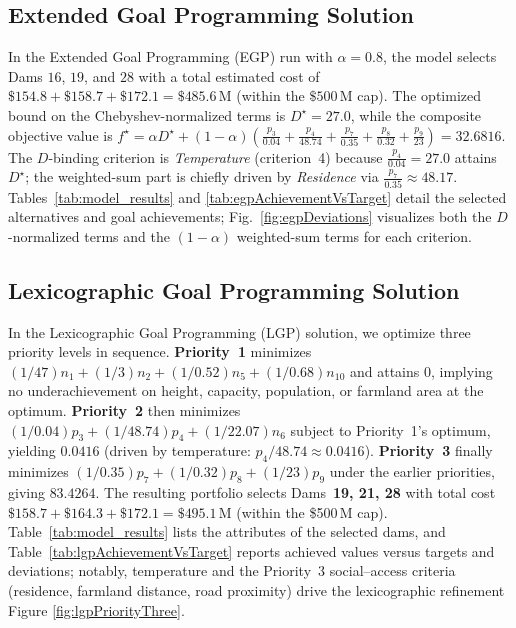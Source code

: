 


\subsection{Extended Goal Programming Solution}
In the Extended Goal Programming (EGP) run with $\alpha=0.8$, the model selects Dams $16$, $19$, and $28$ with a total estimated cost of $\$154.8+\$158.7+\$172.1=\$485.6$\,M (within the $\$500$\,M cap). The optimized bound on the Chebyshev-normalized terms is $D^\star=27.0$, while the composite objective value is $f^\star=\alpha D^\star + (1-\alpha)\!\left(\frac{p_3}{0.04}+\frac{p_4}{48.74}+\frac{p_7}{0.35}+\frac{p_8}{0.32}+\frac{p_9}{23}\right)=32.6816$. The $D$-binding criterion is \emph{Temperature} (criterion~4) because $\tfrac{p_4}{0.04}=27.0$ attains $D^\star$; the weighted-sum part is chiefly driven by \emph{Residence} via $\tfrac{p_7}{0.35}\approx 48.17$. Tables~\ref{tab:model_results} and \ref{tab:egpAchievementVsTarget} detail the selected alternatives and goal achievements; Fig.~\ref{fig:egpDeviations} visualizes both the $D$-normalized terms and the $(1-\alpha)$ weighted-sum terms for each criterion. 




\subsection{Lexicographic Goal Programming Solution}
In the Lexicographic Goal Programming (LGP) solution, we optimize three priority levels in sequence. \textbf{Priority~1} minimizes $(1/47)n_1+(1/3)n_2+(1/0.52)n_5+(1/0.68)n_{10}$ and attains $0$, implying no underachievement on height, capacity, population, or farmland area at the optimum. \textbf{Priority~2} then minimizes $(1/0.04)p_3+(1/48.74)p_4+(1/22.07)n_6$ subject to Priority~1’s optimum, yielding $0.0416$ (driven by temperature: $p_4/48.74\approx 0.0416$). \textbf{Priority~3} finally minimizes $(1/0.35)p_7+(1/0.32)p_8+(1/23)p_9$ under the earlier priorities, giving $83.4264$. The resulting portfolio selects Dams~\textbf{19, 21, 28} with total cost $\$158.7+\$164.3+\$172.1=\$495.1$\,M (within the \$500\,M cap). Table~\ref{tab:model_results} lists the attributes of the selected dams, and Table~\ref{tab:lgpAchievementVsTarget} reports achieved values versus targets and deviations; notably, temperature and the Priority~3 social–access criteria (residence, farmland distance, road proximity) drive the lexicographic refinement Figure \ref{fig:lgpPriorityThree}.

